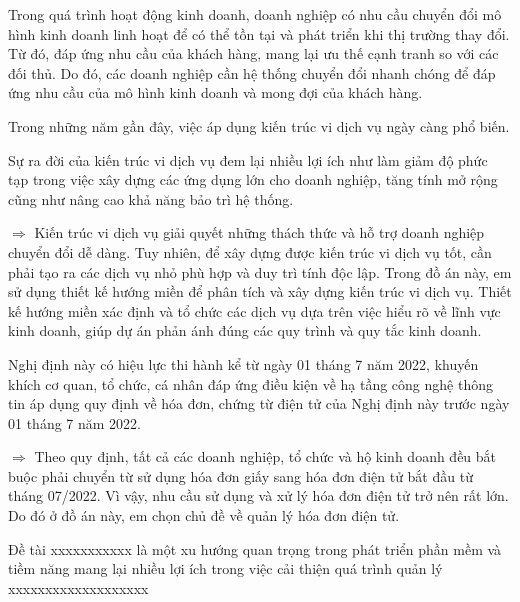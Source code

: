 Trong quá trình hoạt động kinh doanh, doanh nghiệp có nhu cầu chuyển đổi mô hình kinh doanh linh hoạt để có thể tồn tại và phát triển khi thị trường thay đổi. Từ đó, đáp ứng nhu cầu của khách hàng, mang lại ưu thế cạnh tranh so với các đối thủ. Do đó, các doanh nghiệp cần hệ thống chuyển đổi nhanh chóng để đáp ứng nhu cầu của mô hình kinh doanh và mong đợi của khách hàng.


Trong những năm gần đây, việc áp dụng kiến trúc vi dịch vụ ngày càng phổ biến.

Sự ra đời của kiến trúc vi dịch vụ đem lại nhiều lợi ích như làm giảm độ phức tạp trong việc xây dựng các ứng dụng lớn cho doanh nghiệp, tăng tính mở rộng cũng như nâng cao khả năng bảo trì hệ thống.





$\Rightarrow$ Kiến trúc vi dịch vụ giải quyết những thách thức và hỗ trợ doanh nghiệp chuyển đổi dễ dàng. Tuy nhiên, để xây dựng được kiến trúc vi dịch vụ tốt, cần phải tạo ra các dịch vụ nhỏ phù hợp và duy trì tính độc lập. Trong đồ án này, em sử dụng thiết kế hướng miền để phân tích và xây dựng kiến trúc vi dịch vụ. Thiết kế hướng miền xác định và tổ chức các dịch vụ dựa trên việc hiểu rõ về lĩnh vực kinh doanh, giúp dự án phản ánh đúng các quy trình và quy tắc kinh doanh.



Nghị định này có hiệu lực thi hành kể từ ngày 01 tháng 7 năm 2022, khuyến khích cơ quan, tổ chức, cá nhân đáp ứng điều kiện về hạ tầng công nghệ thông tin áp dụng quy định về hóa đơn, chứng từ điện tử của Nghị định này trước ngày 01 tháng 7 năm 2022.


$\Rightarrow$ Theo quy định, tất cả các doanh nghiệp, tổ chức và hộ kinh doanh đều bắt buộc phải chuyển từ sử dụng hóa đơn giấy sang hóa đơn điện tử bắt đầu từ tháng 07/2022. Vì vậy, nhu cầu sử dụng và xử lý hóa đơn điện tử trở nên rất lớn. Do đó ở đồ án này, em chọn chủ đề về quản lý hóa đơn điện tử.

Đề tài xxxxxxxxxxx là một xu hướng quan trọng trong phát triển phần mềm và tiềm năng mang lại nhiều lợi ích trong việc cải thiện quá trình quản lý xxxxxxxxxxxxxxxxxxx